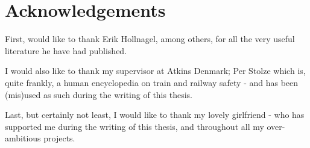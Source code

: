 \chapter{Acknowledgements}
First, would like to thank Erik Hollnagel, among others, for all the very useful literature he have had published.

I would also like to thank my supervisor at Atkins Denmark; Per Stolze which is, quite frankly, a human encyclopedia on train and railway safety - and has been (mis)used as such during the writing of this thesis.

Last, but certainly not least, I would like to thank my lovely girlfriend - who has supported me during the writing of this thesis, and throughout all my over-ambitious projects.